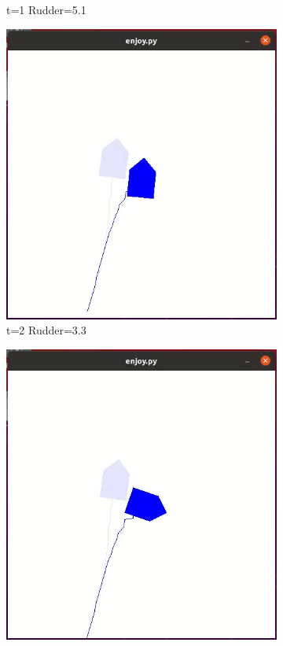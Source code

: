 \documentclass[12pt,twoside]{report}
\begin{document}
\begin{figure}[h]
\begin{subfigure}[b]{0.24\textwidth}
         \caption{t=1 Rudder=5.1}
     \end{subfigure}
     \begin{subfigure}[b]{0.24\textwidth}
         \centering
         \includegraphics[width=\textwidth]{figures/heading-problem/heading-t2.png}
         \caption{t=2 Rudder=3.3}
     \end{subfigure}
     \begin{subfigure}[b]{0.24\textwidth}
         \centering
         \includegraphics[width=\textwidth]{figures/heading-problem/heading-t3.png}

\end{subfigure}
\end{figure}
\end{document}
